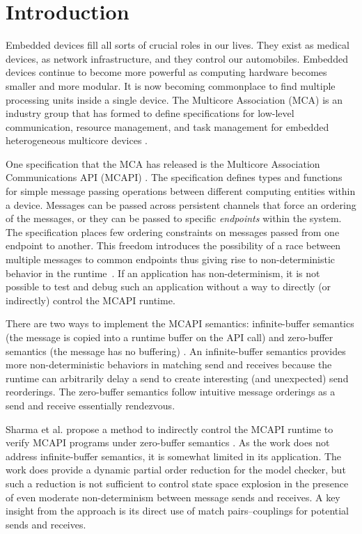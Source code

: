 \section{Introduction}
Embedded devices fill all sorts of crucial roles in our lives. They exist as
medical devices, as network infrastructure, and they control our automobiles.
Embedded devices continue to become more powerful as computing hardware becomes
smaller and more modular. It is now becoming commonplace to find multiple
processing units inside a single device. The Multicore Association (MCA) is an
industry group that has formed to define specifications for low-level
communication, resource management, and task management for embedded heterogeneous
multicore devices \cite{mca}.

One specification that the MCA has released is the Multicore
Association Communications API (MCAPI) \cite{mcapi}. The specification
defines types and functions for simple message passing operations between different
computing entities within a device. Messages can be passed across
persistent channels that force an ordering of the messages, or they
can be passed to specific \emph{endpoints} within the system. The
specification places few ordering constraints on messages passed from
one endpoint to another. This freedom introduces the possibility of a race between multiple messages to common endpoints thus giving rise to non-deterministic behavior in the runtime\ \cite{netzer:spdt96}. If an
application has non-determinism, it is not possible
to test and debug such an application without a way to directly (or
indirectly) control the MCAPI runtime.

There are two ways to implement the MCAPI semantics: infinite-buffer
semantics (the message is copied into a runtime buffer on the API
call) and zero-buffer semantics (the message has no buffering)
\cite{sarvani:fm09}.  An infinite-buffer semantics provides more
non-deterministic behaviors in matching send and receives because the
runtime can arbitrarily delay a send to create interesting (and
unexpected) send reorderings. The zero-buffer semantics follow
intuitive message orderings as a send and receive essentially
rendezvous.

Sharma et al. propose a method to indirectly control the MCAPI runtime
to verify MCAPI programs under zero-buffer semantics
\cite{sharma:fmcad09}. As the work does not address infinite-buffer
semantics, it is somewhat limited in its application. The work does
provide a dynamic partial order reduction for the model checker, but
such a reduction is not sufficient to control state space explosion in
the presence of even moderate non-determinism between message sends
and receives. A key insight from the approach is its direct use of
match pairs--couplings for potential sends and receives.

